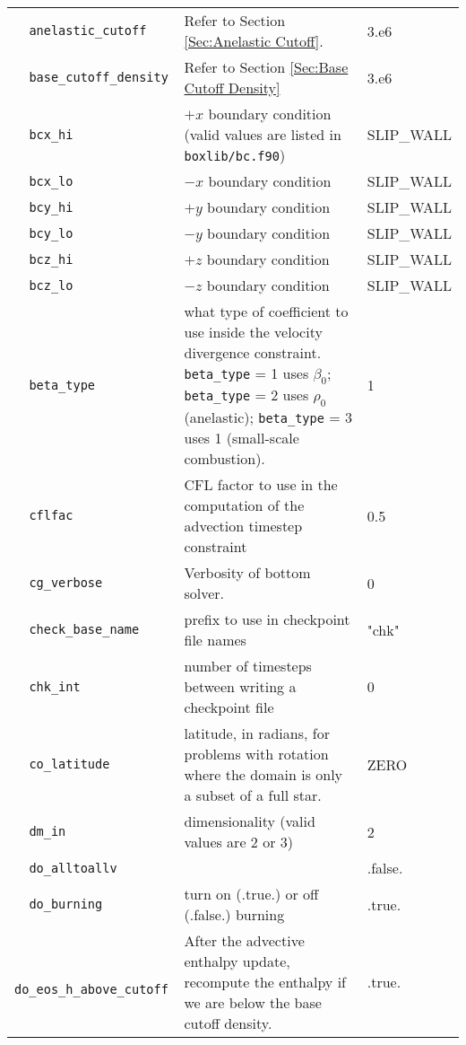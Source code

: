 {\begin{center}
\begin{longtable}{|l|p{3.25in}|l|}
\verb=  anelastic_cutoff =  & Refer to Section \ref{Sec:Anelastic Cutoff}.  &  3.e6 \\
\verb=  base_cutoff_density =  & Refer to Section \ref{Sec:Base Cutoff Density}  
                                     &  3.e6 \\
\verb=  bcx_hi =  & $+x$ boundary condition (valid values are listed in 
                       {\tt  boxlib/bc.f90})  &  SLIP\_WALL \\
\verb=  bcx_lo =  & $-x$ boundary condition  &  SLIP\_WALL \\
\verb=  bcy_hi =  & $+y$ boundary condition  &  SLIP\_WALL \\
\verb=  bcy_lo =  & $-y$ boundary condition  &  SLIP\_WALL \\
\verb=  bcz_hi =  & $+z$ boundary condition  &  SLIP\_WALL \\
\verb=  bcz_lo =  & $-z$ boundary condition  &  SLIP\_WALL \\
\verb=  beta_type =  & what type of coefficient to use inside the velocity divergence 
                           constraint.  {\tt beta\_type} = 1 uses $\beta_0$; 
                           {\tt beta\_type} = 2 uses $\rho_0$ (anelastic);
                           {\tt beta\_type} = 3 uses 1 (small-scale combustion).  &  1 \\
\verb=  cflfac =  & CFL factor to use in the computation of the advection timestep 
                       constraint  &  0.5 \\
\verb=  cg_verbose =  & Verbosity of bottom solver.  &  0 \\
\verb=  check_base_name =  & prefix to use in checkpoint file names  &  "chk" \\
\verb=  chk_int =  & number of timesteps between writing a checkpoint file  & 0 \\
\verb=  co_latitude =  & latitude, in radians, for problems with rotation where the 
                             domain is only a subset of a full star.  &  ZERO \\
\verb=  dm_in =  & dimensionality (valid values are 2 or 3)  &  2 \\
\verb=  do_alltoallv =  &   &  .false. \\
\verb=  do_burning =  & turn on (.true.) or off (.false.) burning  &  .true. \\
\verb=  do_eos_h_above_cutoff =  & After the advective enthalpy update, recompute 
                                          the enthalpy if we are below the base cutoff 
                                          density.   &  .true. \\

\end{longtable}
\end{center}}
